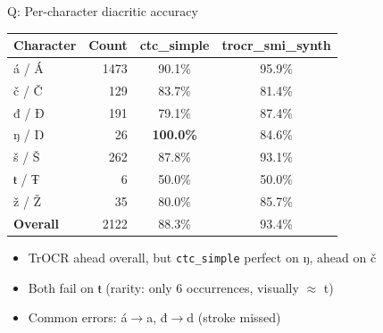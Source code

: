\begin{frame}{Q: Per-character diacritic accuracy}
  \footnotesize
  \begin{center}
    \begin{tabular}{@{}lrcc@{}}
      \toprule
      \textbf{Character} & \textbf{Count} & \textbf{ctc\_simple} & \textbf{trocr\_smi\_synth} \\
      \midrule
      \'{a} / \'{A} & 1473 & 90.1\% & 95.9\% \\
      \v{c} / \v{C} &  129 & 83.7\% & 81.4\% \\
      đ / Đ          &  191 & 79.1\% & 87.4\% \\
      ŋ / Ŋ          &   26 & \textbf{100.0\%} & 84.6\% \\
      \v{s} / \v{S} &  262 & 87.8\% & 93.1\% \\
      ŧ / Ŧ          &    6 & 50.0\% & 50.0\% \\
      \v{z} / \v{Z} &   35 & 80.0\% & 85.7\% \\
      \midrule
      \textbf{Overall} & 2122 & 88.3\% & 93.4\% \\
      \bottomrule
    \end{tabular}
  \end{center}
  \medskip
  \begin{itemize}
    \item TrOCR ahead overall, but \texttt{ctc\_simple} \alert{perfect on ŋ}, ahead on \v{c}
    \item Both fail on ŧ (rarity: only 6 occurrences, visually $\approx$ t)
    \item Common errors: \'{a}$\rightarrow$a, đ$\rightarrow$d (stroke missed)
  \end{itemize}
\end{frame}


